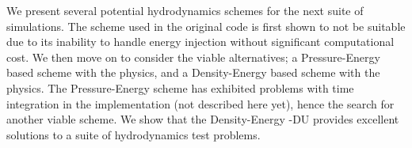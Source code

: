We present several potential hydrodynamics schemes for the next suite
of \eagle{} simulations. The \anarchy{} scheme used in the original \eagle{}
code is first shown to not be suitable due to its inability to handle
energy injection without significant computational cost. We then move
on to consider the viable alternatives; a Pressure-Energy based scheme
with the \anarchy{} physics, and a Density-Energy based scheme with the
\anarchy{} physics. The Pressure-Energy scheme has exhibited problems
with time integration in the \swift{} \eagle{} implementation (not described
here yet), hence the search for another viable scheme. We show that the
Density-Energy \anarchy{}-DU provides excellent solutions to a suite of
hydrodynamics test problems.